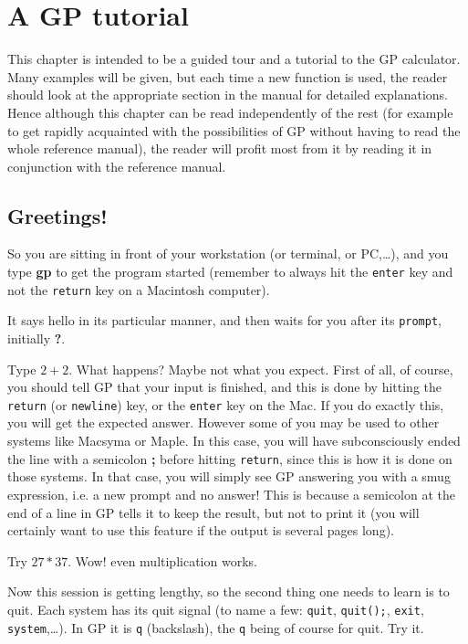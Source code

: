 \chapter{A GP tutorial}

This chapter is intended to be a guided tour and a tutorial to the GP calculator.
Many examples will be given, but each time a new function is used, the reader
should look at the appropriate section in the manual for detailed explanations.
Hence although this chapter can be read independently of the rest (for example
to get rapidly acquainted with the possibilities of GP without having to read
the whole reference manual), the reader will profit most from it by reading it
in conjunction with the reference manual.
\medskip
\section{Greetings!}
\medskip
So you are sitting in front of your workstation (or terminal, or PC,\dots), and you
type {\bf gp} to get the program started (remember to always hit the {\tt enter} key
and not the {\tt return} key on a Macintosh computer). 

It says hello in its particular manner, and then waits for you after its {\tt prompt},
initially {\bf ?}.

Type $2+2$. What happens? Maybe not what you expect. First of all,
of course, you should tell GP that your input is finished, and this is done by hitting
the {\tt return} (or {\tt newline}) key, or the {\tt enter} key on the Mac. If you
do exactly this, you will get the expected answer. However some of you may be used
to other systems like Macsyma or Maple. In this case, you will have subconsciously
ended the line with a semicolon {\bf ;} before hitting {\tt return}, since this is
how it is done on those systems. In that case, you will simply see GP answering
you with a smug expression, i.e. a new prompt and no answer!
This is because a semicolon at the
end of a line in GP tells it to keep the result, but not to print it (you will
certainly want to use this feature if the output is several pages long).

Try $27*37$. Wow! even multiplication works.

Now this session is getting lengthy, so the second thing one needs to learn is to
quit. Each system has its quit signal (to name a few: {\tt quit}, {\tt quit();},
{\tt exit}, {\tt system},\dots). In GP it is {\tt \bs q} (backslash), the
{\tt q} being of course for quit. Try it.

